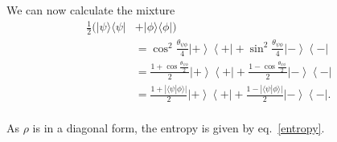 \documentclass[twocolumn,prl,floatfix,superscriptaddress]{revtex4-2}
\begin{document}
We can now calculate the mixture
\begin{align*}
	\frac{1}{2}(|\psi\rangle\langle\psi| &+ |\phi\rangle\langle\phi|) \\
	&=\cos^2\frac{\theta_{\psi\phi}}{4}\left|+\right>\left<+\right| +\sin^2\frac{\theta_{\psi\phi}}{4}\left|-\right>\left<-\right| \\
	&=\frac{1+\cos\frac{\theta_{\psi\phi}}{2}}{2}\left|+\right>\left<+\right| +\frac{1-\cos\frac{\theta_{\psi\phi}}{2}}{2}\left|-\right>\left<-\right| \\
	&=\frac{1+|\langle\psi|\phi\rangle|}{2}\left|+\right>\left<+\right| +\frac{1-|\langle\psi|\phi\rangle|}{2}\left|-\right>\left<-\right|. \\
\end{align*}

As $\rho$ is in a diagonal form, the entropy is given by eq.~\ref{entropy}.
\end{document}
